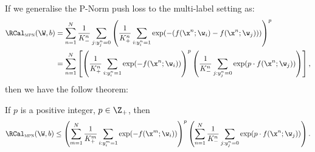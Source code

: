 If we generalise the P-Norm push loss to the multi-label setting as:
\begin{equation}
\label{eq:pnorm-ml}
\begin{aligned}
\RCal_\textsc{mpn}(\W, b) 
&= \sum_{n=1}^N \frac{1}{K_-^n} \sum_{j:y_j^n=0} \left( \frac{1}{K_+^n} \sum_{i:y_i^n=1} \exp(-(f(\x^n; \w_i) - f(\x^n; \w_j))) \right)^p \\
&= \sum_{n=1}^N \left[
   \left( \frac{1}{K_+^n} \sum_{i:y_i^n=1} \exp(-f(\x^n; \w_i)) \right)^p 
   \left( \frac{1}{K_-^n} \sum_{j:y_j^n=0} \exp(p \cdot f(\x^n; \w_j)) \right) \right],
\end{aligned}
\end{equation}
then we have the follow theorem:
\begin{theorem}
\label{theorem:pnorm-ml-ub}
If $p$ is a positive integer, \ie $p \in \Z_+$, then 
\begin{equation}
\label{eq:pnorm-ml-ub}
\RCal_\textsc{mpn}(\W, b) \le 
\left( \sum_{m=1}^N \frac{1}{K_+^m} \sum_{i:y_i^m=1} \exp(-f(\x^m; \w_i)) \right)^p 
\left( \sum_{n=1}^N \frac{1}{K_-^n} \sum_{j:y_j^n=0} \exp(p \cdot f(\x^n; \w_j)) \right).
\end{equation}
\end{theorem}



